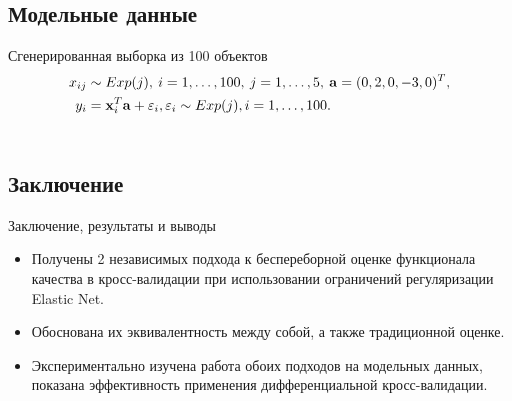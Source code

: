 \documentclass[unicode,lefteqn,c,hyperref={pdfpagelabels=false}]{beamer}
\begin{document}
\subsection{Модельные данные}
\begin{frame}{Сгенерированная выборка из 100 объектов}
	\vspace{-20pt}
	\begin{align*}
		x_{ij} &\sim Exp(j), \: i=1,\ldots,100, \: j=1,\ldots,5, \: \boldsymbol{\mathbf{a}} = (0, 2, 0, -3, 0)^T, \\
		y_{i} &= \boldsymbol{\mathbf{x}}_i^T \boldsymbol{\mathbf{a}} + {\varepsilon}_i, {\varepsilon}_i \sim Exp(j), i=1,\ldots,100. 
	\end{align*}
	\vspace{-15pt}
	\begin{columns}
		\hspace{-15pt}
	\end{columns}
\end{frame}

\section*{}
\subsection{Заключение}
\begin{frame}{Заключение, результаты и выводы}
\begin{itemize}
	\item Получены 2 независимых подхода к беспереборной оценке функционала качества в кросс-валидации при использовании ограничений регуляризации Elastic Net.
	\item Обоснована их эквивалентность между собой, а также традиционной оценке.
	\item Экспериментально изучена работа обоих подходов на модельных 
	данных, показана эффективность применения дифференциальной кросс-валидации.
\end{itemize}
\end{frame}
\end{document}
